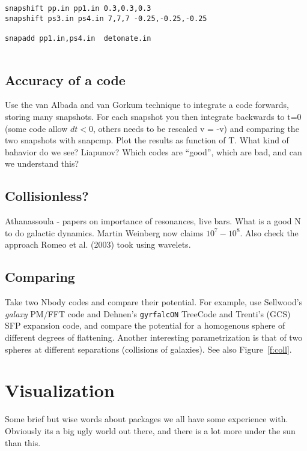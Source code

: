 {\begin{verbatim}
snapshift pp.in pp1.in 0.3,0.3,0.3
snapshift ps3.in ps4.in 7,7,7 -0.25,-0.25,-0.25

snapadd pp1.in,ps4.in  detonate.in


\end{verbatim}\normalsize  

\section{Accuracy of a code}

Use the van Albada and van Gorkum technique to integrate a code
forwards, storing many snapshots. For each snapshot you then integrate
backwards to t=0 (some code allow $dt<0$, others needs to be
rescaled v = -v) and comparing the two snapshots with snapcmp.
Plot the results as function of T. What kind of bahavior do we see?
Liapunov?  Which codes are ``good'', which are bad, and can we 
understand this?


\section{Collisionless?}

Athanassoula - papers on importance of resonances, live bars. What is a good N to do
galactic dynamics. Martin Weinberg now claims $10^7-10^8$. 
Also check the approach Romeo et al. (2003) took using wavelets.

\section{Comparing}

Take two Nbody codes and compare their potential. For example, use Sellwood's 
{\it galaxy} PM/FFT code and Dehnen's {\tt gyrfalcON} TreeCode and Trenti's
(GCS) SFP expansion code,
and compare the
potential for a homogenous sphere of different degrees of flattening.
Another interesting parametrization is that of two spheres at
different separations (collisions of galaxies). See also
Figure~\ref{f:coll}.


\chapter                {Visualization}

Some brief but wise words about packages we all have some experience with.
Obviously its a big ugly world out there, and there is a lot more under the
sun than this.

}
